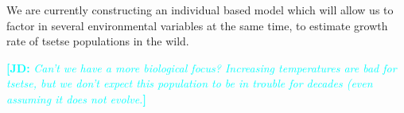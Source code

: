 \documentclass[12pt,a4paper]{article}
\newcommand{\comment}[3]{\textcolor{#1}{\textbf{[#2: }\textsl{#3}\textbf{]}}}
\newcommand{\jd}[1]{\comment{cyan}{JD}{#1}}
\begin{document}
We are currently constructing an individual based model which will allow us to factor in several environmental variables at the same time, to estimate growth rate of tsetse populations in the wild. 

\jd{Can't we have a more biological focus? Increasing temperatures are bad for tsetse, but we don't expect this population to be in trouble for decades (even assuming it does not evolve.}


\nocite{*}

\end{document}
